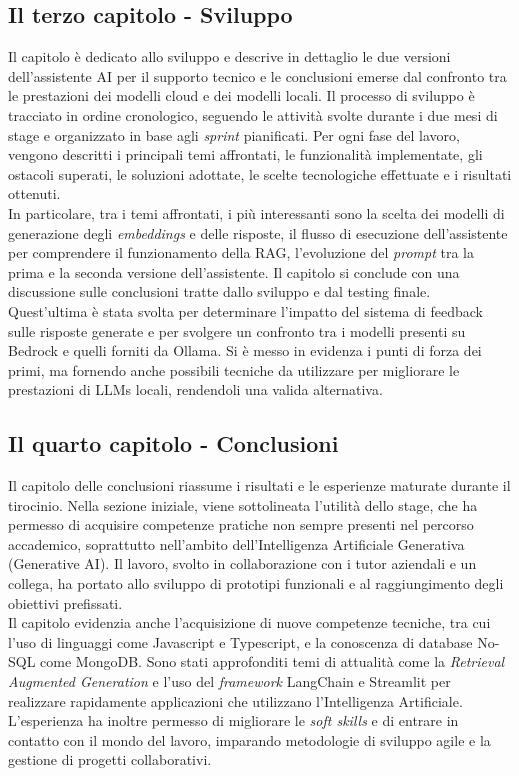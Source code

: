 \subsection{Il terzo capitolo - Sviluppo}
Il capitolo è dedicato allo sviluppo e descrive in dettaglio le due versioni 
dell'assistente AI per il supporto tecnico e le conclusioni emerse dal 
confronto tra le prestazioni dei modelli cloud e dei modelli locali.
Il processo di sviluppo è tracciato in ordine cronologico, seguendo le 
attività svolte durante i due mesi di stage e organizzato in base agli 
\textit{sprint} pianificati. 
Per ogni fase del lavoro, vengono descritti i principali temi affrontati, le 
funzionalità implementate, gli ostacoli superati, le soluzioni adottate, le 
scelte tecnologiche effettuate e i risultati ottenuti. \\
In particolare, tra i temi affrontati, i più interessanti sono la scelta dei 
modelli di generazione degli \textit{embeddings} e delle risposte, il flusso 
di esecuzione dell'assistente per comprendere il funzionamento della RAG, 
l'evoluzione del \textit{prompt} tra la prima e la seconda versione 
dell'assistente. 
Il capitolo si conclude con una discussione sulle conclusioni tratte dallo 
sviluppo e dal testing finale.\\
Quest'ultima è stata svolta per determinare l'impatto del sistema di feedback 
sulle risposte generate e per svolgere un confronto tra i modelli presenti su 
Bedrock e quelli forniti da Ollama. Si è messo in evidenza i punti di forza 
dei primi, ma fornendo anche possibili tecniche da utilizzare per migliorare 
le prestazioni di LLMs locali, rendendoli una valida alternativa.

\subsection{Il quarto capitolo - Conclusioni}
Il capitolo delle conclusioni riassume i risultati e le esperienze maturate 
durante il tirocinio. Nella sezione iniziale, viene sottolineata l'utilità 
dello stage, che ha permesso di acquisire competenze pratiche non sempre 
presenti nel percorso accademico, soprattutto nell'ambito dell'Intelligenza 
Artificiale Generativa (Generative AI). Il lavoro, svolto in collaborazione 
con i tutor aziendali e un collega, ha portato allo sviluppo di prototipi 
funzionali e al raggiungimento degli obiettivi prefissati.\\
Il capitolo evidenzia anche l'acquisizione di nuove competenze tecniche, tra 
cui l'uso di linguaggi come Javascript e Typescript, e la conoscenza di 
database No-SQL come MongoDB. Sono stati approfonditi temi di attualità come 
la \textit{Retrieval Augmented Generation} e l'uso del \textit{framework}
LangChain e Streamlit per realizzare rapidamente applicazioni che utilizzano 
l'Intelligenza Artificiale. 
L'esperienza ha inoltre permesso di migliorare le \textit{soft skills} e di 
entrare in contatto con il mondo del lavoro, imparando metodologie di sviluppo 
agile e la gestione di progetti collaborativi.

